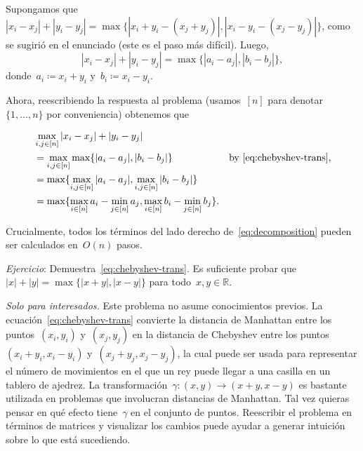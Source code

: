 
Supongamos
que~$|x_i - x_j| + |y_i - y_j| = \max \{|x_i + y_i - (x_j + y_j)|, |x_i - y_i - (x_j -
y_j)| \}$, como se sugirió en el enunciado (este es el paso más difícil). Luego,
\begin{equation}
  \label{eq:chebyshev-trans}
  |x_i - x_j| + |y_i - y_j| = \max \{|a_i - a_j|, |b_i - b_j| \},
\end{equation}
donde~$a_i \coloneqq x_i + y_i$ y~$b_i \coloneqq x_i - y_i$.

Ahora, reescribiendo la respuesta al problema (usamos~$[n]$ para
denotar~$\{1, \dots, n\}$ por conveniencia) obtenemos que

\begin{align}
  \label{eq:decomposition}
  &\max_{i, j \in [n]} |x_i - x_j| + |y_i - y_j| \nonumber \\
  &= \max_{i, j \in [n]} \max \{|a_i - a_j|, |b_i - b_j| \} & \text{by~\eqref{eq:chebyshev-trans},} \nonumber \\
  &= \max \{ \max_{i, j \in [n]} |a_i - a_j|, \max_{i, j \in [n]} |b_i - b_j| \} \nonumber \\
  &= \max \{ \max_{i \in [n]} a_i - \min_{j \in [n]} a_j, \max_{i \in [n]} b_i - \min_{j \in [n]} b_j \}.
\end{align}

Crucialmente, todos los términos del lado derecho de~\eqref{eq:decomposition} pueden ser calculados
en~$O(n)$ pasos.

\textit{Ejercicio}: Demuestra~\eqref{eq:chebyshev-trans}. Es suficiente probar
que~$|x| + |y| = \max \{|x + y|, |x - y|\}$ para todo~$x, y \in \mathbb{R}$.

\textit{Solo para interesados.} Este problema no asume conocimientos previos. La ecuación~\eqref{eq:chebyshev-trans}
convierte la distancia de Manhattan entre los puntos~$(x_i, y_i)$ y~$(x_j, y_j)$ en
la distancia de Chebyshev entre los puntos~$(x_i + y_i, x_i - y_i)$
y~$(x_j + y_j, x_j - y_j)$, la cual puede ser usada para representar el número de
movimientos en el que un rey puede llegar a una casilla en un tablero de ajedrez. La
transformación~$\gamma: (x, y) \rightarrow (x + y, x - y)$ es bastante utilizada en problemas que
involucran distancias de Manhattan. Tal vez quieras pensar en qué efecto
tiene~$\gamma$ en el conjunto de puntos. Reescribir el problema en términos de
matrices y visualizar los cambios puede ayudar a generar intuición sobre lo que está
sucediendo.

